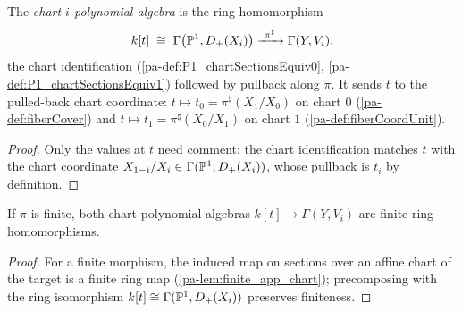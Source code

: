 \begin{definition}
  \label{pa-def:fiberPolyHom}
  \leanok

  The \emph{chart-\(i\) polynomial algebra} is the ring homomorphism
  \[
    k[t] \;\cong\; \Gamma\bigl(\mathbb{P}^1, D_+(X_i)\bigr)
      \xrightarrow{\ \pi^{\sharp}\ } \Gamma(Y, V_i),
  \]
  the chart identification (\ref{pa-def:P1_chartSectionsEquiv0},
  \ref{pa-def:P1_chartSectionsEquiv1}) followed by pullback along \(\pi\). It sends \(t\)
  to the pulled-back chart coordinate: \(t \mapsto t_0 = \pi^{\sharp}(X_1/X_0)\) on
  chart \(0\) (\ref{pa-def:fiberCover}) and \(t \mapsto t_1 = \pi^{\sharp}(X_0/X_1)\) on
  chart \(1\) (\ref{pa-def:fiberCoordUnit}).
\end{definition}
\begin{proof}
  \leanok
  Only the values at \(t\) need comment: the chart identification matches \(t\) with
  the chart coordinate \(X_{1-i}/X_i \in \Gamma(\mathbb{P}^1, D_+(X_i))\), whose pullback is
  \(t_i\) by definition.
\end{proof}

\begin{theorem}
  \label{pa-thm:fiberPolyHom_finite}
  \leanok

  If \(\pi\) is finite, both chart polynomial algebras
  \(k[t] \to \Gamma(Y, V_i)\) are finite ring homomorphisms.
\end{theorem}
\begin{proof}
  \leanok
  For a finite morphism, the induced map on sections over an affine chart of the target
  is a finite ring map (\ref{pa-lem:finite_app_chart}); precomposing with the ring
  isomorphism \(k[t] \cong \Gamma(\mathbb{P}^1, D_+(X_i))\) preserves finiteness.
\end{proof}

